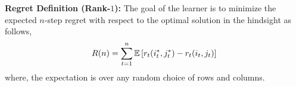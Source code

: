 \textbf{Regret Definition (Rank-$1$):} The goal of the learner is to minimize the expected $n$-step regret with respect to the optimal solution in the hindsight as follows,
\begin{align}
  R(n) =
  \sum_{t = 1}^n \mathbb{E}\left[r_t(i^\ast_t, j^\ast_t) - r_t(i_t,j_t)\right]\,
  \label{eq:regret}
\end{align}
where, the expectation is over any random choice of rows and columns. 








